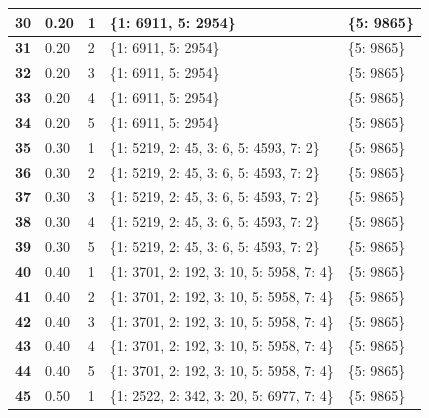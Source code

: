 \documentclass[11pt,onside]{article}
\begin{document}
\begin{table}[]
\begin{tabular}{|l|l|l|l|l|}
\textbf{30} & 0.20         & 1            & \{1: 6911, 5: 2954\}                      & \{5: 9865\}              \\ \hline
\textbf{31} & 0.20         & 2            & \{1: 6911, 5: 2954\}                      & \{5: 9865\}              \\ \hline
\textbf{32} & 0.20         & 3            & \{1: 6911, 5: 2954\}                      & \{5: 9865\}              \\ \hline
\textbf{33} & 0.20         & 4            & \{1: 6911, 5: 2954\}                      & \{5: 9865\}              \\ \hline
\textbf{34} & 0.20         & 5            & \{1: 6911, 5: 2954\}                      & \{5: 9865\}              \\ \hline
\textbf{35} & 0.30         & 1            & \{1: 5219, 2: 45, 3: 6, 5: 4593, 7: 2\}   & \{5: 9865\}              \\ \hline
\textbf{36} & 0.30         & 2            & \{1: 5219, 2: 45, 3: 6, 5: 4593, 7: 2\}   & \{5: 9865\}              \\ \hline
\textbf{37} & 0.30         & 3            & \{1: 5219, 2: 45, 3: 6, 5: 4593, 7: 2\}   & \{5: 9865\}              \\ \hline
\textbf{38} & 0.30         & 4            & \{1: 5219, 2: 45, 3: 6, 5: 4593, 7: 2\}   & \{5: 9865\}              \\ \hline
\textbf{39} & 0.30         & 5            & \{1: 5219, 2: 45, 3: 6, 5: 4593, 7: 2\}   & \{5: 9865\}              \\ \hline
\textbf{40} & 0.40         & 1            & \{1: 3701, 2: 192, 3: 10, 5: 5958, 7: 4\} & \{5: 9865\}              \\ \hline
\textbf{41} & 0.40         & 2            & \{1: 3701, 2: 192, 3: 10, 5: 5958, 7: 4\} & \{5: 9865\}              \\ \hline
\textbf{42} & 0.40         & 3            & \{1: 3701, 2: 192, 3: 10, 5: 5958, 7: 4\} & \{5: 9865\}              \\ \hline
\textbf{43} & 0.40         & 4            & \{1: 3701, 2: 192, 3: 10, 5: 5958, 7: 4\} & \{5: 9865\}              \\ \hline
\textbf{44} & 0.40         & 5            & \{1: 3701, 2: 192, 3: 10, 5: 5958, 7: 4\} & \{5: 9865\}              \\ \hline
\textbf{45} & 0.50         & 1            & \{1: 2522, 2: 342, 3: 20, 5: 6977, 7: 4\} & \{5: 9865\}              \\ \hline

\end{tabular}
\end{table}
\end{document}
